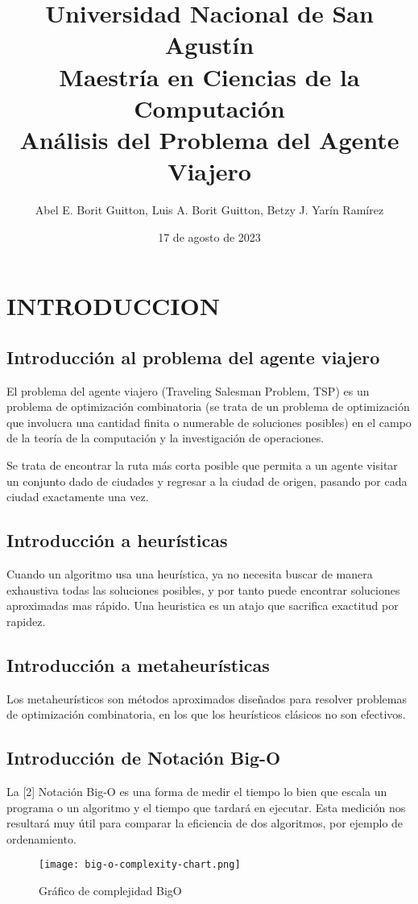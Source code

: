 \documentclass{article}
\title{\textbf{%
    Universidad Nacional de San Agustín \\
    Maestría en Ciencias de la Computación \\
    \large Análisis del Problema del Agente Viajero}}
\author{Abel E. Borit Guitton, Luis A. Borit Guitton, Betzy J. Yarín Ramírez}
\date{17 de agosto de 2023}
\begin{document}
\maketitle

\section{INTRODUCCION}
\subsection{Introducción al problema del agente viajero}
El problema del agente viajero (Traveling Salesman Problem, TSP) es un problema de optimización combinatoria (se trata de un problema de optimización que involucra una cantidad finita o numerable de soluciones posibles) en el campo de la teoría de la computación y la investigación de operaciones. 

Se trata de encontrar la ruta más corta posible que permita a un agente visitar un conjunto dado de ciudades y regresar a la ciudad de origen, pasando por cada ciudad exactamente una vez.

\subsection{Introducción a heurísticas}
Cuando un algoritmo usa una heurística, ya no necesita buscar de manera exhaustiva todas las soluciones posibles, y por tanto puede encontrar soluciones aproximadas mas rápido. Una heuristica es un atajo que sacrifica exactitud por rapidez.

\subsection{Introducción a metaheurísticas}
Los metaheurísticos son métodos aproximados diseñados para resolver problemas de optimización combinatoria, en los que los heurísticos clásicos no son efectivos.

\subsection{Introducción de Notación Big-O}
La [2] Notación Big-O es una forma de medir el tiempo lo bien que escala un programa o un algoritmo y el tiempo que tardará en ejecutar. Esta medición nos resultará muy útil para comparar la eficiencia de dos algoritmos, por ejemplo de ordenamiento.

\begin{figure}[H]
\centering
\texttt{[image: big-o-complexity-chart.png]}
\caption{\label{fig:bigo}Gráfico de complejidad BigO}
\end{figure}
\end{document}
